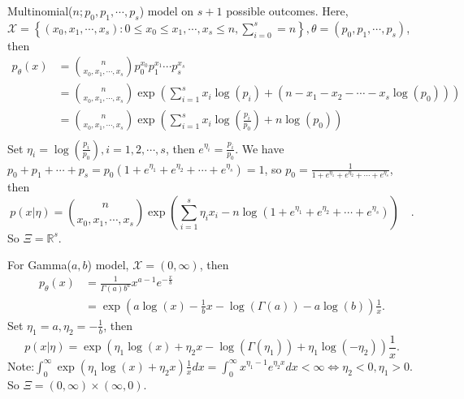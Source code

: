 \documentclass[a4paper]{article}
\begin{document}
\begin{eg}
	Multinomial($n; p_0, p_1, \cdots, p_s$) model on $s+1$ possible outcomes. Here, $\mathcal{X} = \left\{(x_0, x_1, \cdots, x_s): 0 \leq x_0 \leq x_1, \cdots, x_s \leq n, \sum\limits_{i = 0}^s = n\right\}, \theta = (p_0, p_1, \cdots, p_s)$, then
	\begin{equation}
		\begin{aligned}
			p_{\theta} (x) &= \binom{n}{x_0, x_1, \cdots, x_s} p_0^{x_0} p_1^{x_1} \cdots p_s^{x_s} \\
			&= \binom{n}{x_0, x_1, \cdots, x_s} \exp\left(\sum\limits_{i = 1}^s x_i \log(p_i) + (n - x_1 - x_2 - \cdots - x_s \log(p_0))\right) \\
			&= \binom{n}{x_0, x_1, \cdots, x_s} \exp\left(\sum\limits_{i = 1}^s x_i \log\left(\frac{p_i}{p_0}\right) + n\log(p_0)\right) \\
		\end{aligned}
	\end{equation}
	Set $\eta_i = \log\left(\frac{p_i}{p_0}\right), i = 1, 2, \cdots, s$, then $e^{\eta_i} = \frac{p_i}{p_0}$.
	We have $p_0 + p_1 + \cdots + p_s = p_0(1+e^{\eta_1}+e^{\eta_2}+\cdots+e^{\eta_s}) = 1$, so $p_0 = \frac{1}{1+e^{\eta_1}+e^{\eta_2}+\cdots+e^{\eta_s}}$, then
	\begin{equation}
		p(x|\eta) = \binom{n}{x_0, x_1, \cdots, x_s} \exp\left(\sum\limits_{i = 1}^s \eta_i x_i - n\log(1+e^{\eta_1}+e^{\eta_2}+\cdots+e^{\eta_s})\right)\quad.
	\end{equation}
	So $\Xi = \mathbb{R}^s$.
\end{eg}

\begin{eg}
	For Gamma($a,b$) model, $\mathcal{X} = (0, \infty)$, then
	\begin{equation}
		\begin{aligned}
			p_\theta(x) &= \frac{1}{\Gamma (a) b^a} x^{a-1}e^{-\frac{x}{b}}\\
			&=\exp \left(a \log (x) - \frac{1}{b} x -\log(\Gamma (a))- a \log (b)\right) \frac{1}{x}.
		\end{aligned}
	\end{equation}
	Set $\eta_1 = a, \eta_2 = -\frac{1}{b}$, then
	\begin{equation}
		p(x|\eta) = \exp(\eta_1\log(x)+\eta_2x-\log(\Gamma(\eta_1))+\eta_1\log(-\eta_2))\frac{1}{x}.
	\end{equation}
	Note:$\int_{0}^{\infty} \exp (\eta_1\log(x) + \eta_2x) \frac{1}{x}dx = \int_{0}^{\infty} x^{\eta_1 -1} e^{\eta_2x}dx < \infty \iff \eta_2<0, \eta_1 > 0$.
	So $\Xi = (0, \infty) \times (\infty,0).$
\end{eg}
\end{document}
